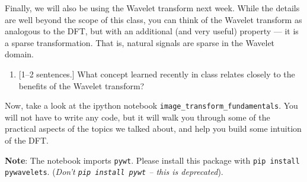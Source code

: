 Finally, we will also be using the Wavelet transform next week. While the details are well beyond the scope of this class, you can think of the Wavelet transform as analogous to the DFT, but with an additional (and very useful) property --- it is a sparse transformation. That is, natural signals are sparse in the Wavelet domain.

\begin{enumerate}[start=3]
    \item {[1--2 sentences.]}
    What concept learned recently in class relates closely to the benefits of the Wavelet transform?
    \sol{}
\end{enumerate}

Now, take a look at the ipython notebook \verb|image_transform_fundamentals|. You will not have to write any code, but it will walk you through some of the practical aspects of the topics we talked about, and help you build some intuition of the DFT.

\textbf{Note}: The notebook imports \texttt{pywt}. Please install this package with \texttt{pip install pywavelets}. (\textit{Don't \texttt{pip install pywt} -- this is deprecated}).
